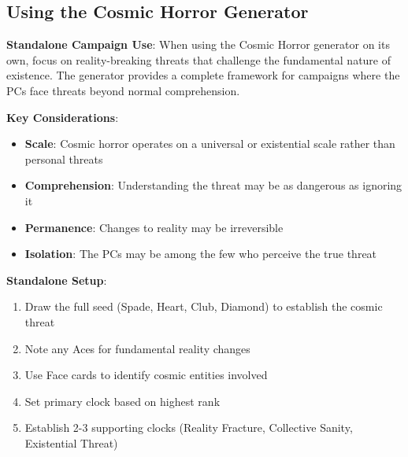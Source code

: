\documentclass[11pt]{article}
\begin{document}
\subsection*{Using the Cosmic Horror Generator}

\begin{mdframed}[backgroundcolor=shadecolor]
\textbf{Standalone Campaign Use}:
When using the Cosmic Horror generator on its own, focus on reality-breaking threats that challenge the fundamental nature of existence. The generator provides a complete framework for campaigns where the PCs face threats beyond normal comprehension.

\textbf{Key Considerations}:
\begin{itemize}[leftmargin=*]
\item \textbf{Scale}: Cosmic horror operates on a universal or existential scale rather than personal threats
\item \textbf{Comprehension}: Understanding the threat may be as dangerous as ignoring it
\item \textbf{Permanence}: Changes to reality may be irreversible
\item \textbf{Isolation}: The PCs may be among the few who perceive the true threat
\end{itemize}

\textbf{Standalone Setup}:
\begin{enumerate}[leftmargin=*]
\item Draw the full seed (Spade, Heart, Club, Diamond) to establish the cosmic threat
\item Note any Aces for fundamental reality changes
\item Use Face cards to identify cosmic entities involved
\item Set primary clock based on highest rank
\item Establish 2-3 supporting clocks (Reality Fracture, Collective Sanity, Existential Threat)
\end{enumerate}
\end{mdframed}
\end{document}
